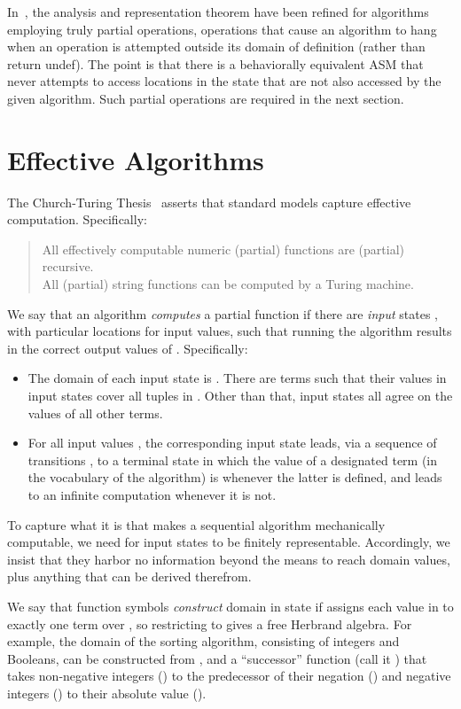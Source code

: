 \documentclass[copyright,creativecommons,english]{eptcs}
\newcommand{\Undef}{\textsf{undef}}
\begin{document}
In~\cite{Exact}, the analysis and representation theorem have been refined for algorithms employing truly partial operations, 
operations that cause an algorithm to hang when an operation is attempted outside its domain of definition
(rather than return \Undef\/).
The point is that 
there is a behaviorally equivalent ASM that never attempts to access locations in the state that are not also accessed by the given algorithm.
Such partial operations are required in the next section.

\section{Effective Algorithms}\label{sec:eff}

The Church-Turing Thesis~\cite[Thesis I]{Kleene67} asserts that standard models capture effective computation.
Specifically:
\begin{quote}
All effectively computable numeric (partial) functions are (partial) recursive.\\
All (partial) string functions can be computed by a Turing machine.
\end{quote}

We say that an algorithm \emph{computes} a partial function
 if there are \emph{input} states , with particular locations for input values, such that
running the algorithm results in the correct output values of .
Specifically:
\begin{itemize}
\item The domain of each input state is .  There are  terms such that their values in input states cover all tuples in .  
Other than that, input states all agree on the values of all other terms.
\item For all  input values , the corresponding input state leads,
via a sequence of transitions ,
to a terminal state in which the value of a designated term  (in the vocabulary of the algorithm) is  whenever the latter is defined, and leads to an infinite computation whenever it is not.
\end{itemize}

To capture what it is that makes a sequential algorithm mechanically computable, we  need for
input states to be finitely representable.
Accordingly, we insist that they harbor no information beyond the means to reach domain values, plus anything that can be derived therefrom.

We say that function symbols  \emph{construct} domain  in state 
if  assigns each value in  to exactly one term over ,
so restricting  to  gives a free Herbrand algebra.
For example, the domain of the sorting algorithm, consisting of integers and Booleans, can be constructed from , and a 
``successor'' function (call it ) that takes non-negative integers () to the predecessor of their negation () and negative integers () to their absolute value ().
\end{document}
